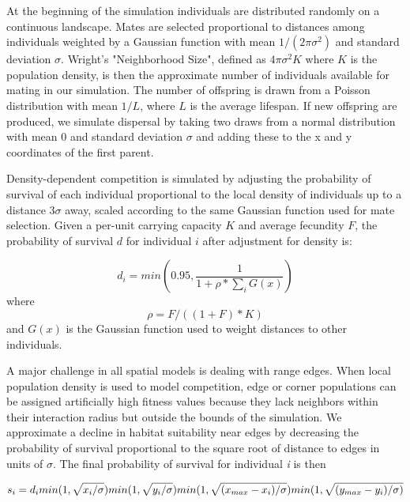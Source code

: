 \documentclass[10pt,twoside,lineno]{gsajnl}
\begin{document}
At the beginning of the simulation individuals are distributed randomly on a continuous landscape. Mates are selected proportional to distances among individuals weighted by a Gaussian function with mean $1/(2\pi\sigma^2)$ and standard deviation $\sigma$. Wright's \cite{Wright1943} "Neighborhood Size", defined as $4\pi\sigma^2 K$ where $K$ is the population density, is then the approximate number of individuals available for mating in our simulation. The number of offspring is drawn from a Poisson distribution with mean $1/L$, where $L$ is the average lifespan. If new offspring are produced, we simulate dispersal by taking two draws from a normal distribution with mean 0 and standard deviation $\sigma$ and adding these to the x and y coordinates of the first parent. 

Density-dependent competition is simulated by adjusting the probability of survival of each individual proportional to the local density of individuals up to a distance $3\sigma$ away, scaled according to the same Gaussian function used for mate selection. Given a per-unit carrying capacity $K$ and average fecundity $F$, the probability of survival $d$ for individual $i$ after adjustment for density is:

\begin{equation}
    d_{i}=min(0.95,\frac{1}{1+\rho*\sum_{i}{G(x)}})
\end{equation}
where 
\begin{equation}
    \rho = F/((1+F)*K)
\end{equation} 
and $G(x)$ is the Gaussian function used to weight distances to other individuals. 

A major challenge in all spatial models is dealing with range edges. When local population density is used to model competition, edge or corner populations can be assigned artificially high fitness values because they lack neighbors within their interaction radius but outside the bounds of the simulation. We approximate a decline in habitat suitability near edges by decreasing the probability of survival proportional to the square root of distance to edges in units of $\sigma$. The final probability of survival for individual \textit{i} is then

\begin{equation}
    s_{i}=d_{i} min(1,\sqrt{x_{i}/\sigma})
    min(1,\sqrt{y_{i}/\sigma})\\
    min(1,\sqrt{(x_{max}-x_{i})/\sigma})
    min(1,\sqrt{(y_{max}-y_{i})/\sigma)}
\end{equation}
\end{document}
